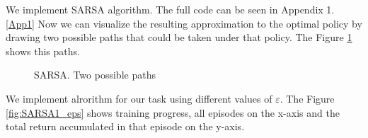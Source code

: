 \documentclass[a4paper, twoside, english]{article}
\begin{document}
We implement SARSA algorithm. The full code can be seen in Appendix 1. \ref{App1} Now we can visualize the resulting approximation to the optimal policy by drawing two possible paths that could be taken under that policy. The Figure \ref{fig:path} shows this paths.\\
\begin{figure}[h!]
	\centerline
	{
		\quad
	}
	\caption[null]{SARSA. Two possible paths}
	\label{fig:path}
\end{figure}

\newpage

We implement alrorithm for our task using different values of $\varepsilon$. The Figure \ref{fig:SARSA1_eps} shows training progress, all episodes on the x-axis and the total return accumulated in that episode on the y-axis.\\
\end{document}
